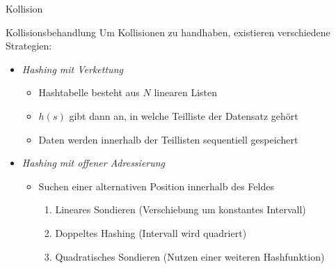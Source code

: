 \documentclass[german]{../spicker}
\begin{document}
\begin{defi}{Kollision}
\begin{center}
    \end{center}

\end{defi}

\begin{defi}{Kollisionsbehandlung}
    Um Kollisionen zu handhaben, existieren verschiedene Strategien:
    \begin{itemize}
        \item \emph{Hashing mit Verkettung}
              \begin{itemize}
                  \item Hashtabelle besteht aus $N$ linearen Listen
                  \item $h(s)$ gibt dann an, in welche Teilliste der Datensatz gehört
                  \item Daten werden innerhalb der Teillisten sequentiell gespeichert
              \end{itemize}
        \item \emph{Hashing mit offener Adressierung}
              \begin{itemize}
                  \item Suchen einer alternativen Position innerhalb des Feldes
                        \begin{enumerate}
                            \item Lineares Sondieren (Verschiebung um konstantes Intervall)
                            \item Doppeltes Hashing (Intervall wird quadriert)
                            \item Quadratisches Sondieren (Nutzen einer weiteren Hashfunktion)
                        \end{enumerate}
              \end{itemize}
    \end{itemize}
\end{defi}
\end{document}
